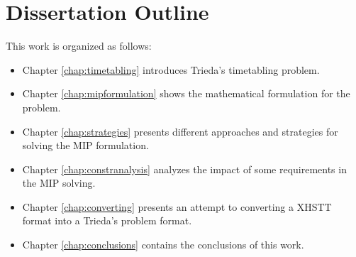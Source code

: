 \section{Dissertation Outline}
This work is organized as follows: 
\begin{itemize}
	\item Chapter \ref{chap:timetabling} introduces Trieda's timetabling problem.
	\item Chapter \ref{chap:mipformulation} shows the mathematical formulation for the problem.
	\item Chapter \ref{chap:strategies} presents different approaches and strategies for solving the MIP formulation.
	\item Chapter \ref{chap:constranalysis} analyzes the impact of some requirements in the MIP solving.
	\item Chapter \ref{chap:converting} presents an attempt to converting a XHSTT format into a Trieda's problem format.
	\item Chapter \ref{chap:conclusions} contains the conclusions of this work.
\end{itemize}